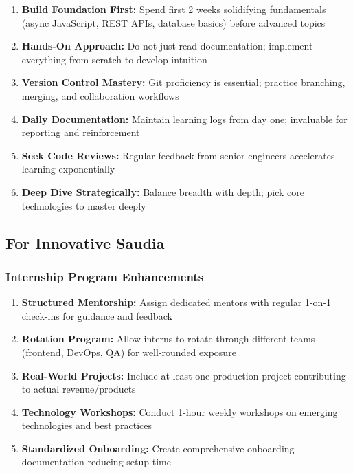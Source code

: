 \begin{enumerate}
    \item \textbf{Build Foundation First:} Spend first 2 weeks solidifying fundamentals (async JavaScript, REST APIs, database basics) before advanced topics
    
    \item \textbf{Hands-On Approach:} Do not just read documentation; implement everything from scratch to develop intuition
    
    \item \textbf{Version Control Mastery:} Git proficiency is essential; practice branching, merging, and collaboration workflows
    
    \item \textbf{Daily Documentation:} Maintain learning logs from day one; invaluable for reporting and reinforcement
    
    \item \textbf{Seek Code Reviews:} Regular feedback from senior engineers accelerates learning exponentially
    
    \item \textbf{Deep Dive Strategically:} Balance breadth with depth; pick core technologies to master deeply
\end{enumerate}

\subsection{For Innovative Saudia}

\subsubsection{Internship Program Enhancements}

\begin{enumerate}
    \item \textbf{Structured Mentorship:} Assign dedicated mentors with regular 1-on-1 check-ins for guidance and feedback
    
    \item \textbf{Rotation Program:} Allow interns to rotate through different teams (frontend, DevOps, QA) for well-rounded exposure
    
    \item \textbf{Real-World Projects:} Include at least one production project contributing to actual revenue/products
    
    \item \textbf{Technology Workshops:} Conduct 1-hour weekly workshops on emerging technologies and best practices
    
    \item \textbf{Standardized Onboarding:} Create comprehensive onboarding documentation reducing setup time
\end{enumerate}

